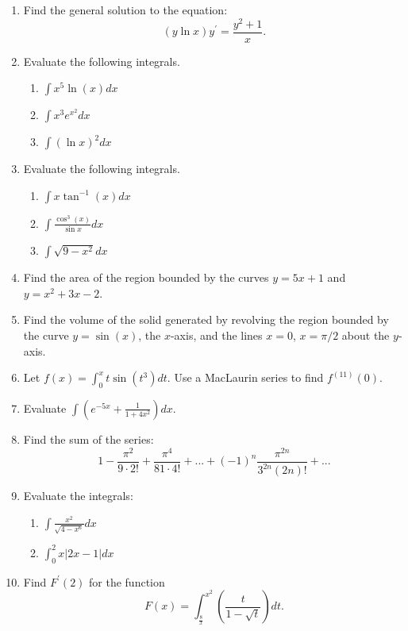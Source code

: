 \documentclass[12pt]{article}
\begin{document}
\begin{enumerate}
\item 
Find the general solution to the equation:
$$(y \ln x) y^{\prime} = {\frac{y^2+1}{x}}.$$
\medskip

\item 
Evaluate the following integrals.
\begin{enumerate}
\item $\int x^5 \ln (x) dx$
\medskip
\item $\int x^3 e^{x^2} dx$
\medskip
\item $\int (\ln x)^2 dx$
\medskip
\end{enumerate}

\item 
Evaluate the following integrals.
\begin{enumerate}
\item $\int x \tan^{-1} (x) dx$
\medskip
\item $\int {\frac{\cos^3 (x)}{\sin x}} dx$
\medskip
\item $\int \sqrt{9-x^2} dx$
\medskip
\end{enumerate}

\item 
 Find the area of the region bounded by the curves $y=5x+1$
and $y=x^2+3x-2$.
\medskip

\item 
Find the volume of the solid generated by revolving the
region bounded by the curve $y=\sin(x)$, the $x$-axis, and the lines $x=0$,
$x=\pi/2$ about the $y$-axis.
\medskip

\item 
Let  $f(x) = \int_0^x t \sin(t^3) dt$.  Use a MacLaurin 
series to find $f^{(11)}(0)$.
\medskip

\item 
Evaluate $\int \left ( e^{-5x} + {\frac{1}{1+4x^2}} 
\right ) dx.$
\medskip

\item 
Find the sum of the series:
$$1 - {\frac{\pi^2}{9 \cdot 2!}} + {\frac{\pi^4}{81 \cdot 4!}} + ... +
(-1)^n {\frac{\pi^{2n}}{3^{2n} (2n)!}} + ...$$
\medskip

\item 
Evaluate the integrals:
\begin{enumerate}
\item $\int {\frac{x^2}{\sqrt{4-x^6}}} dx$
\medskip
\item $\int_0^2 x |2x-1| dx$ 
\medskip
\end{enumerate}

\item 
Find $F^{\prime}(2)$ for the function
$$F(x) = \int_{\frac{8}{x}}^{x^2} \left ( {\frac{t}{1 - \sqrt{t}}} 
\right ) dt.$$
\medskip


\end{enumerate}
\end{document}

